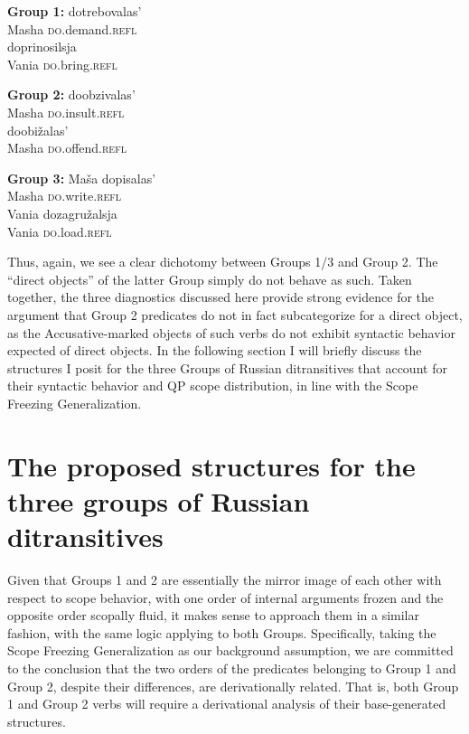 \documentclass[output=paper,colorlinks,citecolor=brown,nonflat]{./langscibook}
\begin{document}
\ea%
    \label{ex:antonyuk:44}
    \textbf{Group 1:}
    \ea \label{ex:antonyuk:44a}
       {dotrebovalas’}\\
    {} Masha   \textsc{do}.demand.\textsc{refl}\\
    \ex \label{ex:antonyuk:44b}
       {doprinosilsja}\\
    {} Vania   \textsc{do}.bring.\textsc{refl}\\
    \z
\z

\ea%
    \label{ex:antonyuk:45}
    \textbf{Group 2:}
    \ea \label{ex:antonyuk:45a}
       {doobzivalas’}\\
    Masha \textsc{do}.insult.\textsc{refl}\\
    \ex \label{ex:antonyuk:45b}
      {doobižalas’}\\
    Masha \textsc{do}.offend.\textsc{refl}\\
    \z
\z

\ea%
    \label{ex:antonyuk:46}
    \textbf{Group 3:}
    \ea \label{ex:antonyuk:46a}
     {Maša} {dopisalas’}\\
    { } Masha \textsc{do}.write.\textsc{refl}\\
    \ex \label{ex:antonyuk:46b}
    \gll {*} {Vania} {dozagružalsja}\\
    { } Vania \textsc{do}.load.\textsc{refl}\\
    \z
\z

Thus, again, we see a clear dichotomy between Groups 1/3 and Group 2. The “direct objects” of the latter Group simply do not behave as such. Taken together, the three diagnostics discussed here provide strong evidence for the argument that Group 2 predicates do not in fact subcategorize for a direct object, as the Accusative-marked objects of such verbs do not exhibit syntactic behavior expected of direct objects. In the following section I will briefly discuss the structures I posit for the three Groups of Russian ditransitives that account for their syntactic behavior and QP scope distribution, in line with the Scope Freezing Generalization.

\section{The proposed structures for the three groups of Russian ditransitives}\label{sec:antonyuk:4}

Given that Groups 1 and 2 are essentially the mirror image of each other with respect to scope behavior, with one order of internal arguments frozen and the opposite order scopally fluid, it makes sense to approach them in a similar fashion, with the same logic applying to both Groups. Specifically, taking the Scope Freezing Generalization as our background assumption, we are committed to the conclusion that the two orders of the predicates belonging to Group 1 and Group 2, despite their differences, are derivationally related. That is, both Group 1 and Group 2 verbs will require a derivational analysis of their base-generated structures.
\end{document}

